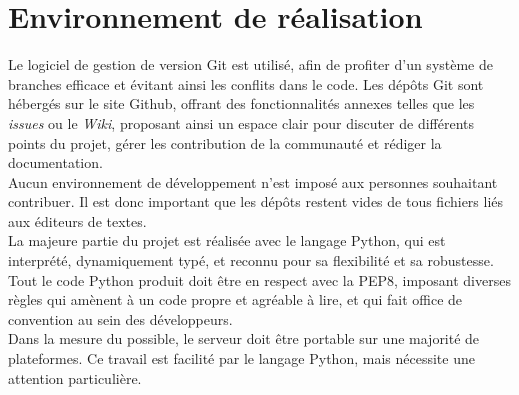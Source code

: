 \section{Environnement de réalisation}
Le logiciel de gestion de version Git est utilisé, afin de profiter d'un système de branches efficace et évitant ainsi les conflits dans le code.
Les dépôts Git sont hébergés sur le site Github, offrant des fonctionnalités annexes telles que les \textit{issues} ou le \textit{Wiki}, proposant ainsi un espace clair pour discuter de différents points du projet, gérer les contribution de la communauté et rédiger la documentation.\\

Aucun environnement de développement n'est imposé aux personnes souhaitant contribuer. Il est donc important que les dépôts restent vides de tous fichiers liés aux éditeurs de textes.\\

La majeure partie du projet est réalisée avec le langage Python, qui est interprété, dynamiquement typé, et reconnu pour sa flexibilité et sa robustesse.\\
Tout le code Python produit doit être en respect avec la PEP8, imposant diverses règles qui amènent à un code propre et agréable à lire, et qui fait office de convention au sein des développeurs.\\

Dans la mesure du possible, le serveur doit être portable sur une majorité de plateformes. Ce travail est facilité par le langage Python, mais nécessite une attention particulière.
